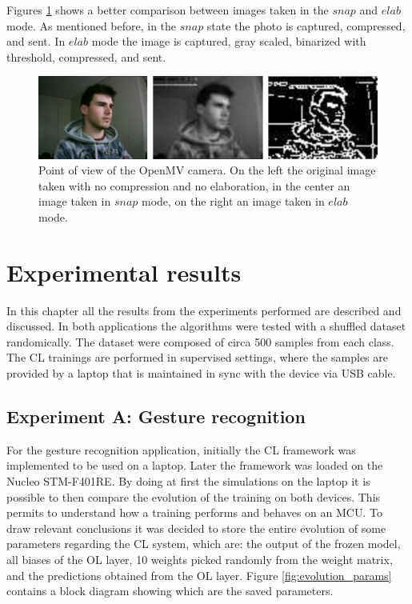\documentclass[12pt]{report}
\begin{document}
Figures \ref{fig:openmv_pov} shows a better comparison between images taken in the $snap$ and $elab$ mode. As mentioned before, in the $snap$ state the photo is captured, compressed, and sent. In $elab$ mode the image is captured, gray scaled, binarized with threshold, compressed, and sent.

\begin{figure}[h!]
    \centering
    \includegraphics[width=140mm]{Figures/Chapter4/openmv_pov.jpg} 
    \caption{Point of view of the OpenMV camera. On the left the original image taken with no compression and no elaboration, in the center an image taken in $snap$ mode, on the right an image taken in $elab$ mode.}
    \label{fig:openmv_pov}    
\end{figure}


\chapter{Experimental results} 
In this chapter all the results from the experiments performed are described and discussed. In both applications the algorithms were tested with a shuffled dataset randomically. The dataset were composed of circa 500 samples from each class. The CL trainings are performed in supervised settings, where the samples are provided by a laptop that is maintained in sync with the device via USB cable.

\section{Experiment A: Gesture recognition}
For the gesture recognition application, initially the CL framework was implemented to be used on a laptop. Later the framework was loaded on the Nucleo STM-F401RE. By doing at first the simulations on the laptop it is possible to then compare the evolution of the training on both devices. This permits to understand how a training performs and behaves on an MCU. To draw relevant conclusions it was decided to store the entire evolution of some parameters regarding the CL system, which are: the output of the frozen model, all biases of the OL layer, 10 weights picked randomly from the weight matrix, and the predictions obtained from the OL layer. Figure \ref{fig:evolution_params} contains a block diagram showing which are the saved parameters. 
\end{document}
